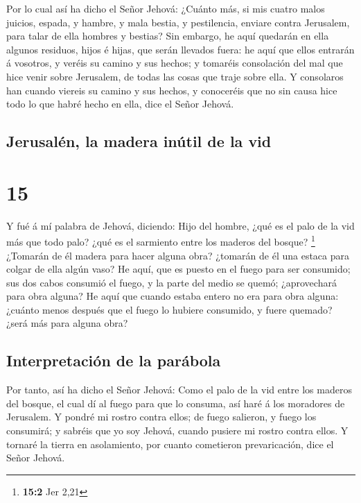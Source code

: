  Por lo cual así ha dicho el Señor Jehová: ¿Cuánto más,
si mis cuatro malos juicios, espada, y hambre, y mala bestia, y
pestilencia, enviare contra Jerusalem, para talar de ella hombres y
bestias?  Sin embargo, he aquí quedarán en ella algunos
residuos, hijos é hijas, que serán llevados fuera: he aquí que ellos
entrarán á vosotros, y veréis su camino y sus hechos; y tomaréis
consolación del mal que hice venir sobre Jerusalem, de todas las cosas
que traje sobre ella.  Y consolaros han cuando viereis su
camino y sus hechos, y conoceréis que no sin causa hice todo lo que
habré hecho en ella, dice el Señor Jehová.

\hypertarget{jerusaluxe9n-la-madera-inuxfatil-de-la-vid}{%
\subsection{Jerusalén, la madera inútil de la
vid}\label{jerusaluxe9n-la-madera-inuxfatil-de-la-vid}}

\hypertarget{section-14}{%
\section{15}\label{section-14}}

 Y fué á mí palabra de Jehová, diciendo: 
Hijo del hombre, ¿qué es el palo de la vid más que todo palo? ¿qué es el
sarmiento entre los maderos del bosque? \footnote{\textbf{15:2} Jer 2,21}
 ¿Tomarán de él madera para hacer alguna obra? ¿tomarán de
él una estaca para colgar de ella algún vaso?  He aquí,
que es puesto en el fuego para ser consumido; sus dos cabos consumió el
fuego, y la parte del medio se quemó; ¿aprovechará para obra alguna?
 He aquí que cuando estaba entero no era para obra alguna:
¿cuánto menos después que el fuego lo hubiere consumido, y fuere
quemado? ¿será más para alguna obra?

\hypertarget{interpretaciuxf3n-de-la-paruxe1bola}{%
\subsection{Interpretación de la
parábola}\label{interpretaciuxf3n-de-la-paruxe1bola}}

 Por tanto, así ha dicho el Señor Jehová: Como el palo de
la vid entre los maderos del bosque, el cual dí al fuego para que lo
consuma, así haré á los moradores de Jerusalem.  Y pondré
mi rostro contra ellos; de fuego salieron, y fuego los consumirá; y
sabréis que yo soy Jehová, cuando pusiere mi rostro contra ellos.
 Y tornaré la tierra en asolamiento, por cuanto cometieron
prevaricación, dice el Señor Jehová.

